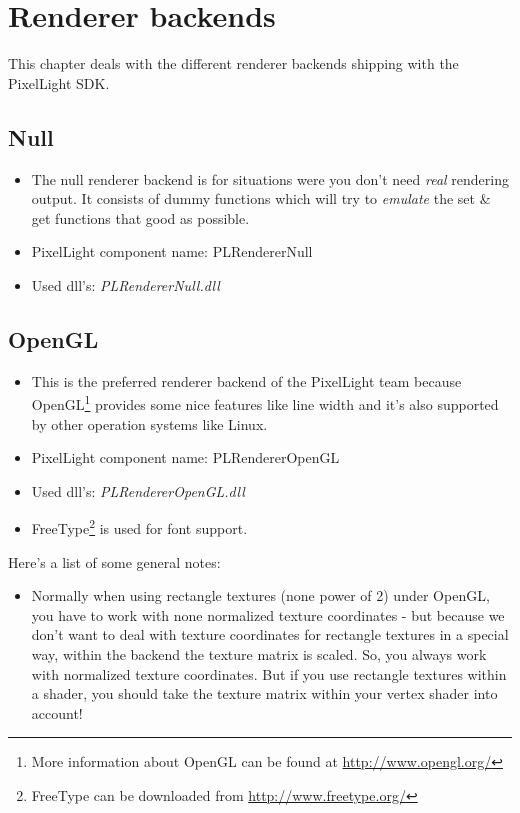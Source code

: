 \chapter{Renderer backends}
This chapter deals with the different renderer backends shipping with the PixelLight SDK.




\section{Null}
\begin{itemize}
\item The null renderer backend is for situations were you don't need \emph{real} rendering output. It consists of dummy functions which will try to \emph{emulate} the set \& get functions that good as possible.
\item PixelLight component name: PLRendererNull
\item Used dll's: \emph{PLRendererNull.dll}
\end{itemize}




\section{OpenGL}
\begin{itemize}
\item This is the preferred renderer backend of the PixelLight team because OpenGL\footnote{More information about OpenGL can be found at \url{http://www.opengl.org/}} provides some nice features like line width and it's also supported by other operation systems like Linux.
\item PixelLight component name: PLRendererOpenGL
\item Used dll's: \emph{PLRendererOpenGL.dll}
\item FreeType\footnote{FreeType can be downloaded from \url{http://www.freetype.org/}} is used for font support.
\end{itemize}

Here's a list of some general notes:
\begin{itemize}
\item Normally when using rectangle textures (none power of 2) under OpenGL, you have to work with none normalized texture coordinates - but because we don't want to deal with texture coordinates for rectangle textures in a special way, within the backend the texture matrix is scaled. So, you always work with normalized texture coordinates. But if you use rectangle textures within a shader, you should take the texture matrix within your vertex shader into account!
\end{itemize}

